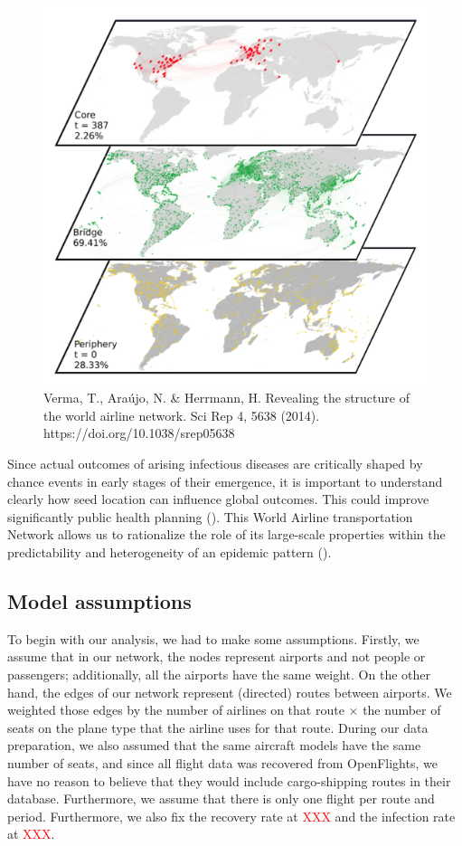 \documentclass{Template resources/netsci-project}
\begin{document}
\begin{figure}[!ht]
    \centering
    \includegraphics[scale=0.8]{References/layers.png}
    \caption{Verma, T., Araújo, N. \& Herrmann, H. Revealing the structure of the world airline network. Sci Rep 4, 5638 (2014). https://doi.org/10.1038/srep05638}
    \label{fig:layers}
\end{figure}
Since actual outcomes of arising infectious diseases are critically shaped by chance events in early stages of their emergence, it is important to understand clearly how seed location can influence global outcomes. This could improve significantly public health planning (\cite{Lawyer2016}). 
This World Airline transportation Network allows us to rationalize the role of its large-scale properties within the predictability and heterogeneity of an epidemic pattern (\cite{Colizza2006TheMO}). 


\subsection{Model assumptions}
To begin with our analysis, we had to make some assumptions. Firstly, we assume that in our network, the nodes represent airports and not people or passengers; additionally, all the airports have the same weight. On the other hand, the edges of our network represent (directed) routes between airports. We weighted those edges by the number of airlines on that route $\times$ the number of seats on the plane type that the airline uses for that route. During our data preparation, we also assumed that the same aircraft models have the same number of seats, and since all flight data was recovered from OpenFlights, we have no reason to believe that they would include cargo-shipping routes in their database. Furthermore, we assume that there is only one flight per route and period.
Furthermore, we also fix the recovery rate at \textcolor{red}{XXX} and the infection rate at \textcolor{red}{XXX}.
\end{document}
